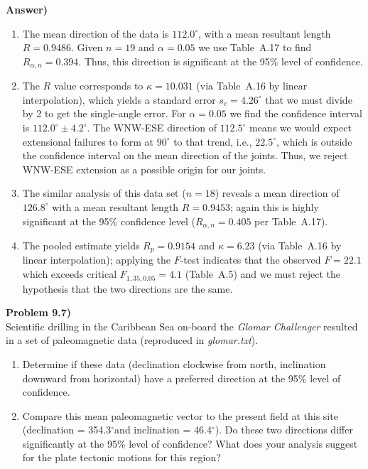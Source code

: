 \documentclass[10pt,letter]{report}
\newcommand{\DS}{$^{\circ}$}
\newcommand{\DSm}{^{\circ}}
\renewcommand{\bf}{\textbf}
\begin{document}
	\noindent
	\bf{Answer)}
	\begin{enumerate}[label=\alph*)]
	\item  The mean direction of the data is $112.0\DSm$,
	with a mean resultant length $R = 0.9486$.  Given $n = 19$ and $\alpha = 0.05$ we use Table~A.17
	to find $R_{\alpha,n} = 0.394$.  Thus,
	this direction is significant at the 95\% level of confidence.

	\item The $R$ value corresponds to $\kappa = 10.031$ (via Table~A.16 by linear interpolation),
	which yields a standard error $s_e = 4.26\DSm$
	that we must divide by 2 to get the single-angle error.  For
	$\alpha = 0.05$ we find the confidence interval is $112.0\DSm\pm4.2\DSm$. The WNW-ESE direction of $112.5\DSm$
	means we would expect extensional failures to form at $90\DSm$ to that trend, i.e., $22.5\DSm$, which is outside
	the confidence interval on the mean direction of the joints.  Thus, we reject WNW-ESE
	extension as a possible origin for our joints.

	\item The similar analysis of this data set ($n = 18$) reveals a mean direction of $126.8\DSm$ with a mean resultant
	length $R = 0.9453$; again this is highly significant at the 95\% confidence level ($R_{\alpha,n} = 0.405$ per Table~A.17).

	\item The pooled estimate yields $R_p = 0.9154$ and $\kappa = 6.23$ (via Table~A.16 by linear interpolation);
	applying the $F$-test
	indicates that the observed $F = 22.1$ which exceeds critical $F_{1,35,0.05} = 4.1$ (Table~A.5) and
	we must reject the hypothesis that the two directions are the same.

	\end{enumerate}

	\bf{Problem 9.7)} \\

	Scientific drilling in the Caribbean Sea on-board the \emph{Glomar Challenger} resulted in a set of paleomagnetic data (reproduced in \emph{glomar.txt}).
	\begin{enumerate}[label=\alph*)]
	\item Determine if these data (declination clockwise from north, inclination downward from horizontal) have a
	preferred direction at the 95\% level of confidence.
	\item Compare this mean paleomagnetic vector to the present field
	at this site (declination = 354.3\DS and inclination = 46.4\DS).
	Do these two directions differ significantly at the 95\% level of confidence?
	What does your analysis suggest for the plate tectonic motions for this region?
	\end{enumerate}
\end{document}
